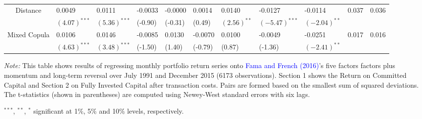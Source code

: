 \begin{table}[!ht]
\begin{threeparttable}[H]
\begin{tabularx}{\textwidth}{@{\extracolsep{\fill}} lllllllllll@{}}
		\multicolumn{1}{c}{Distance} & 0.0049 & 0.0111 & -0.0033 & -0.0000 & 0.0014 & 0.0140 & -0.0127 & -0.0114 & 0.037 & 0.036 \\
		\multicolumn{1}{c}{} & $(4.07)^{***}$ & $(5.36)^{***}$ & (-0.90) & (-0.31) & (0.49) & $(2.56)^{**}$ & $(-5.47)^{***}$ & $(-2.04)^{**}$ & & \vspace{.1cm}\\
		\multicolumn{1}{c}{Mixed Copula} & 0.0106 & 0.0146 & -0.0085 & 0.0130 & -0.0070 & 0.0100 & -0.0049 & -0.0251 & 0.017 & 0.016 \\
		\multicolumn{1}{c}{} & $(4.63)^{***}$ & $(3.48)^{***}$ & (-1.50) & (1.40) & (-0.79) & (0.87) & (-1.36) & $(-2.41)^{**}$ & & \\
				\bottomrule
			\end{tabularx}
			\begin{tablenotes}
				\item \textit{Note:} \tiny  This table shows results of regressing monthly portfolio return series onto \textcolor{blue}{Fama and French} \textcolor{blue}{(2016)}'s five factors factors plus momentum and long-term reversal over July 1991 and December 2015 (6173 observations). Section 1 shows the Return on Committed Capital and Section 2 on Fully Invested Capital after transaction costs. Pairs are formed based on the smallest sum of squared deviations. The t-statistics (shown in parentheses) are computed using Newey-West standard errors with six lags.
				\item \footnotesize $^{\ast\ast\ast}$, $^{\ast\ast}$, $^{\ast}$  significant at 1\%, 5\% and 10\% levels, respectively.
			\end{tablenotes}
		\end{threeparttable}%
		\label{tab:table105}%
	\end{table}%

\newpage